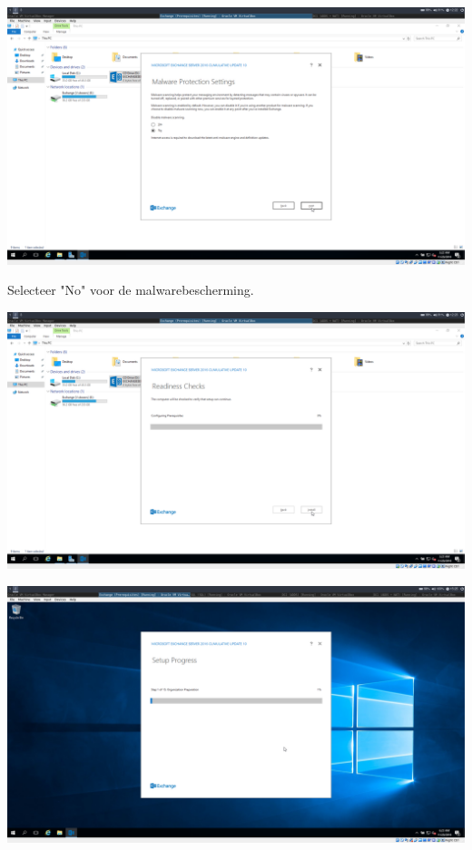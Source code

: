 \documentclass[a4paper]{article}
\begin{document}
\begin{center}
	\includegraphics[width=15cm]{Pictures/Exchange/install/1542712978.png}
	
	Selecteer "No" voor de malwarebescherming.
\end{center}
\begin{center}
	\includegraphics[width=15cm]{Pictures/Exchange/install/1542712981.png}
	
	
\end{center}
\begin{center}
	\includegraphics[width=15cm]{Pictures/Exchange/install/1542723945.png}
	
	
\end{center}
\end{document}
